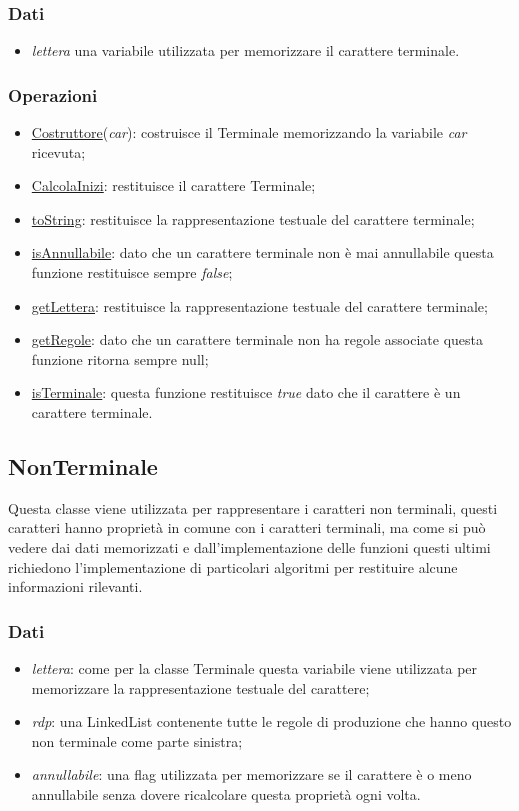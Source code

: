\documentclass[12pt]{article}
\begin{document}
\subsubsection{Dati}
\begin{itemize}
\item\textit{lettera} una variabile utilizzata per memorizzare il carattere terminale.
\end{itemize}
\subsubsection{Operazioni}
\begin{itemize}
\item\underline{Costruttore}(\textit{car}): costruisce il Terminale memorizzando la variabile \textit{car} ricevuta;
\item\underline{CalcolaInizi}: restituisce il carattere Terminale;
\item\underline{toString}: restituisce la rappresentazione testuale del carattere terminale;
\item\underline{isAnnullabile}: dato che un carattere terminale non è mai annullabile questa funzione restituisce sempre \textit{false};
\item\underline{getLettera}: restituisce la rappresentazione testuale del carattere terminale;
\item\underline{getRegole}: dato che un carattere terminale non ha regole associate questa funzione ritorna sempre null;
\item\underline{isTerminale}: questa funzione restituisce \textit{true} dato che il carattere è un carattere terminale.
\end{itemize}


\subsection{NonTerminale}
Questa classe viene utilizzata per rappresentare i caratteri non terminali, questi caratteri hanno proprietà in comune con i caratteri terminali, ma come si può vedere dai dati memorizzati e dall'implementazione delle funzioni questi ultimi richiedono l'implementazione di particolari algoritmi per restituire alcune informazioni rilevanti.
\subsubsection{Dati}
\begin{itemize}
\item\textit{lettera}: come per la classe Terminale questa variabile viene utilizzata per memorizzare la rappresentazione testuale del carattere;
\item\textit{rdp}: una LinkedList contenente tutte le regole di produzione che hanno questo non terminale come parte sinistra;
\item\textit{annullabile}: una flag utilizzata per memorizzare se il carattere è o meno annullabile senza dovere ricalcolare questa proprietà ogni volta.
\end{itemize}
\end{document}
